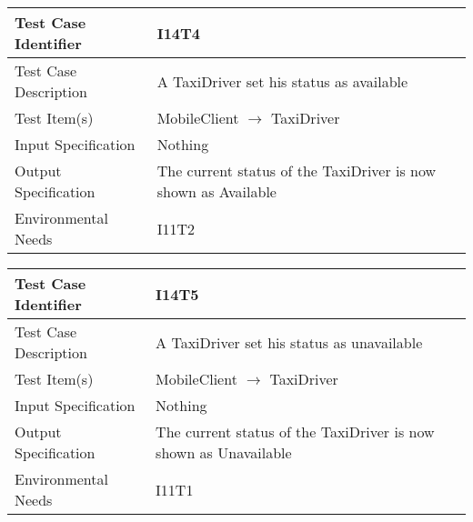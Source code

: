 		\vspace{1cm}
		\begin{center}
			\begin{tabular}{ |l p{10cm}| } \hline
				Test Case Identifier & I14T4 \\ \hline
				Test Case Description & A TaxiDriver set his status as available  \\ \hline
				Test Item(s) & MobileClient $\rightarrow$ TaxiDriver \\ \hline
				Input Specification & Nothing \\ \hline
				Output Specification & The current status of the TaxiDriver is now shown as Available \\ \hline
				Environmental Needs & I11T2 \\ \hline
			\end{tabular}
			\vspace{1cm}
			\begin{tabular}{ |l p{10cm}| } \hline
				Test Case Identifier & I14T5 \\ \hline
				Test Case Description & A TaxiDriver set his status as unavailable  \\ \hline
				Test Item(s) & MobileClient $\rightarrow$ TaxiDriver \\ \hline
				Input Specification & Nothing \\ \hline
				Output Specification & The current status of the TaxiDriver is now shown as Unavailable \\ \hline
				Environmental Needs & I11T1 \\ \hline
			\end{tabular}
		\end{center}
